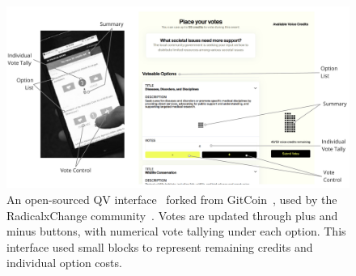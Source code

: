 \begin{figure}[h]
    \centering
    \includegraphics[width=\textwidth]{content/image/curr_interface/recent_annotated.pdf}
    \caption{An open-sourced QV interface~\cite{RadicalxChangeQuadraticvoting2024} forked from GitCoin~\cite{ReadWhitepaperGitcoin}, used by the RadicalxChange community~\cite{RxC}. Votes are updated through plus and minus buttons, with numerical vote tallying under each option. This interface used small blocks to represent remaining credits and individual option costs.}
    \Description{}
    \label{fig:rcx_interface_annotated}
\end{figure}


